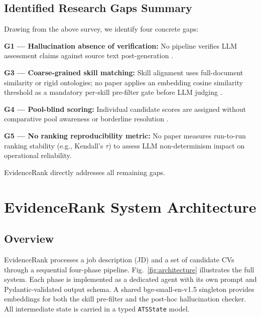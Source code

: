 \documentclass[journal]{IEEEtran}
\begin{document}
\subsection{Identified Research Gaps Summary}

Drawing from the above survey, we identify four concrete gaps:

\textbf{G1 — Hallucination absence of verification:} No pipeline verifies LLM
assessment claims against source text post-generation \cite{chowdhury2026,
jahan2026, hoque2026}.

\textbf{G3 — Coarse-grained skill matching:} Skill alignment uses full-document
similarity or rigid ontologies; no paper applies an embedding cosine similarity
threshold as a mandatory per-skill pre-filter gate before LLM judging \cite{alonso2025, ajjam2026}.

\textbf{G4 — Pool-blind scoring:} Individual candidate scores are assigned without
comparative pool awareness or borderline resolution \cite{hoque2026,
chowdhury2026}.

\textbf{G5 — No ranking reproducibility metric:} No paper measures run-to-run
ranking stability (e.g., Kendall's $\tau$) to assess LLM non-determinism impact
on operational reliability.

EvidenceRank directly addresses all remaining gaps.


\section{EvidenceRank System Architecture}
\label{sec:system}

\subsection{Overview}

EvidenceRank processes a job description (JD) and a set of candidate CVs
through a sequential four-phase pipeline. Fig.~\ref{fig:architecture} illustrates
the full system. Each phase is implemented as a dedicated agent with its own
prompt and Pydantic-validated output schema. A shared bge-small-en-v1.5 singleton provides embeddings for both the skill
pre-filter and the post-hoc hallucination checker. All intermediate state is carried in a typed \texttt{ATSState} model.
\end{document}

